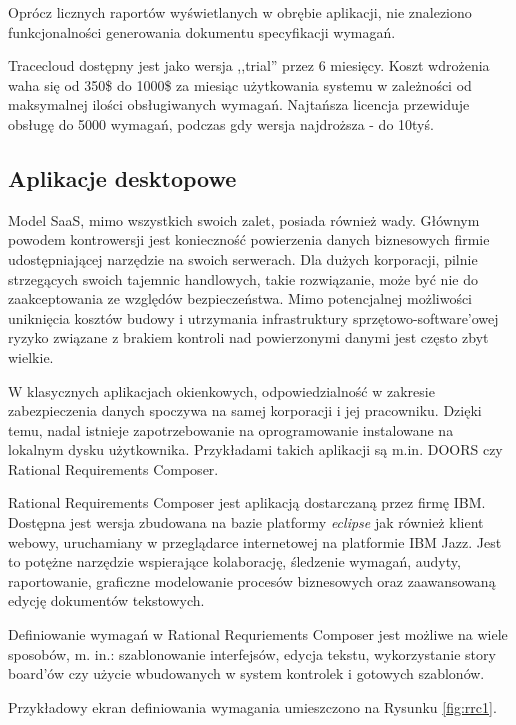         Oprócz licznych raportów wyświetlanych w obrębie aplikacji, nie znaleziono funkcjonalności generowania dokumentu specyfikacji wymagań. 

        Tracecloud dostępny jest jako wersja ,,trial'' przez 6 miesięcy. Koszt wdrożenia waha się od 350\$ do 1000\$ za miesiąc użytkowania systemu w zależności od maksymalnej ilości obsługiwanych wymagań. Najtańsza licencja przewiduje obsługę do 5000 wymagań, podczas gdy wersja najdroższa - do 10tyś.

    \subsection{Aplikacje desktopowe}

      Model SaaS, mimo wszystkich swoich zalet, posiada również wady. Głównym powodem kontrowersji jest konieczność powierzenia danych biznesowych firmie udostępniającej narzędzie na swoich serwerach. Dla dużych korporacji, pilnie strzegących swoich tajemnic handlowych, takie rozwiązanie, może być nie do zaakceptowania ze względów bezpieczeństwa. Mimo potencjalnej możliwości uniknięcia kosztów budowy i utrzymania infrastruktury sprzętowo-software'owej ryzyko związane z brakiem kontroli nad powierzonymi danymi jest często zbyt wielkie. 

      W klasycznych aplikacjach okienkowych, odpowiedzialność w zakresie zabezpieczenia danych spoczywa na samej korporacji i jej pracowniku. Dzięki temu, nadal istnieje zapotrzebowanie na oprogramowanie instalowane na lokalnym dysku użytkownika. Przykładami takich aplikacji są m.in. DOORS czy Rational Requirements Composer.

      Rational Requirements Composer jest aplikacją dostarczaną przez firmę IBM. Dostępna jest wersja zbudowana na bazie platformy \emph{eclipse} jak również klient webowy, uruchamiany w przeglądarce internetowej na platformie IBM Jazz. Jest to potężne narzędzie wspierające kolaborację, śledzenie wymagań, audyty, raportowanie, graficzne modelowanie procesów biznesowych oraz zaawansowaną edycję dokumentów tekstowych. 

      Definiowanie wymagań w Rational Requriements Composer jest możliwe na wiele sposobów, m. in.: szablonowanie interfejsów, edycja tekstu, wykorzystanie story board'ów czy użycie wbudowanych w system kontrolek i gotowych szablonów.

      Przykładowy ekran definiowania wymagania umieszczono na Rysunku \ref{fig:rrc1}.

